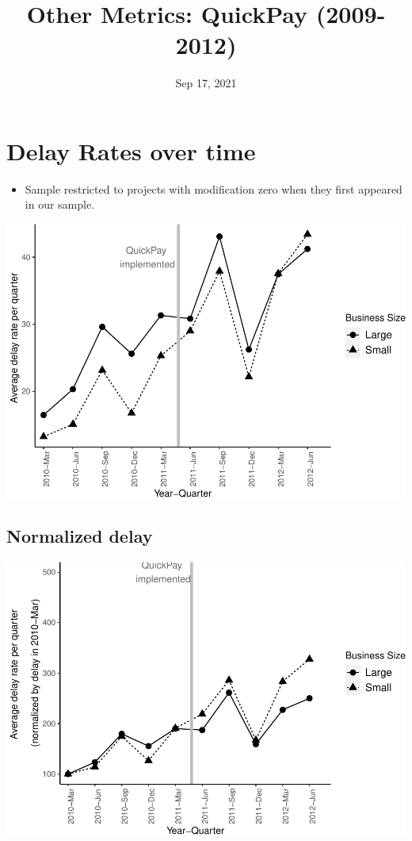 \documentclass[
]{article}
\title{Other Metrics: QuickPay (2009-2012)}
\author{}
\date{\vspace{-2.5em}Sep 17, 2021}
\providecommand{\tightlist}{%
  \setlength{\itemsep}{0pt}\setlength{\parskip}{0pt}}
\begin{document}
\maketitle

\hypertarget{delay-rates-over-time}{%
\section{Delay Rates over time}\label{delay-rates-over-time}}

\begin{itemize}
\tightlist
\item
  Sample restricted to projects with modification zero when they first
  appeared in our sample.
\end{itemize}

\includegraphics{qp_first_delay_files/figure-latex/plot_relative_delay-1.pdf}

\hypertarget{normalized-delay}{%
\subsection{Normalized delay}\label{normalized-delay}}

\includegraphics{qp_first_delay_files/figure-latex/normalized_plot-1.pdf}
\end{document}
